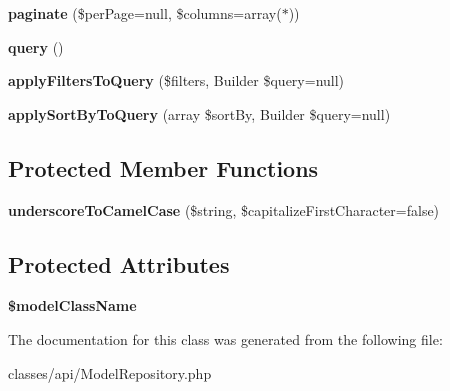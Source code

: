 \begin{DoxyCompactItemize}
\item 
\hypertarget{classDMA_1_1Friends_1_1Classes_1_1API_1_1ModelRepository_ae811e3b83e7b83a9e416891f05c3663a}{}{\bfseries paginate} (\$per\+Page=null, \$columns=array(\textquotesingle{}$\ast$\textquotesingle{}))\label{classDMA_1_1Friends_1_1Classes_1_1API_1_1ModelRepository_ae811e3b83e7b83a9e416891f05c3663a}

\item 
\hypertarget{classDMA_1_1Friends_1_1Classes_1_1API_1_1ModelRepository_a74d22b1eb362f430442b124ef4c56f8d}{}{\bfseries query} ()\label{classDMA_1_1Friends_1_1Classes_1_1API_1_1ModelRepository_a74d22b1eb362f430442b124ef4c56f8d}

\item 
\hypertarget{classDMA_1_1Friends_1_1Classes_1_1API_1_1ModelRepository_a2f05483bfae07df7442d03247ae6ce0e}{}{\bfseries apply\+Filters\+To\+Query} (\$filters, Builder \$query=null)\label{classDMA_1_1Friends_1_1Classes_1_1API_1_1ModelRepository_a2f05483bfae07df7442d03247ae6ce0e}

\item 
\hypertarget{classDMA_1_1Friends_1_1Classes_1_1API_1_1ModelRepository_ac0aebd79aec29cd7d7734cf7ae662197}{}{\bfseries apply\+Sort\+By\+To\+Query} (array \$sort\+By, Builder \$query=null)\label{classDMA_1_1Friends_1_1Classes_1_1API_1_1ModelRepository_ac0aebd79aec29cd7d7734cf7ae662197}

\end{DoxyCompactItemize}
\subsection*{Protected Member Functions}
\begin{DoxyCompactItemize}
\item 
\hypertarget{classDMA_1_1Friends_1_1Classes_1_1API_1_1ModelRepository_ab43cd8076e76a7bd8a4666374c4345f6}{}{\bfseries underscore\+To\+Camel\+Case} (\$string, \$capitalize\+First\+Character=false)\label{classDMA_1_1Friends_1_1Classes_1_1API_1_1ModelRepository_ab43cd8076e76a7bd8a4666374c4345f6}

\end{DoxyCompactItemize}
\subsection*{Protected Attributes}
\begin{DoxyCompactItemize}
\item 
\hypertarget{classDMA_1_1Friends_1_1Classes_1_1API_1_1ModelRepository_ad500a9ecb29cac5c77b7efc26c1de4a0}{}{\bfseries \$model\+Class\+Name}\label{classDMA_1_1Friends_1_1Classes_1_1API_1_1ModelRepository_ad500a9ecb29cac5c77b7efc26c1de4a0}

\end{DoxyCompactItemize}


The documentation for this class was generated from the following file\+:\begin{DoxyCompactItemize}
\item 
classes/api/Model\+Repository.\+php\end{DoxyCompactItemize}
